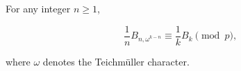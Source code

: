 For any integer $n \geq 1$,

$$\frac{1}{n} B_{n,\omega^{k-n}} \equiv \frac{1}{k} B_k \pmod{p},$$

where $\omega$ denotes the Teichmüller character.
